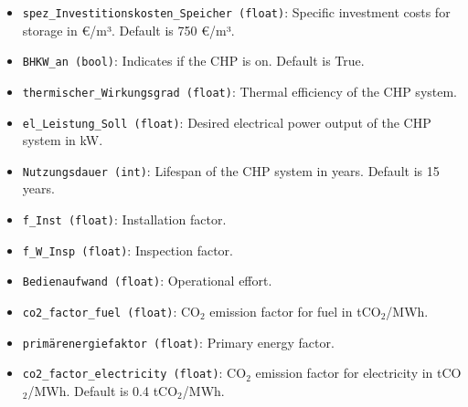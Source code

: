 \begin{itemize}
    \item \texttt{spez\_Investitionskosten\_Speicher (float)}: Specific investment costs for storage in €/m³. Default is 750 €/m³.
    \item \texttt{BHKW\_an (bool)}: Indicates if the CHP is on. Default is True.
    \item \texttt{thermischer\_Wirkungsgrad (float)}: Thermal efficiency of the CHP system.
    \item \texttt{el\_Leistung\_Soll (float)}: Desired electrical power output of the CHP system in kW.
    \item \texttt{Nutzungsdauer (int)}: Lifespan of the CHP system in years. Default is 15 years.
    \item \texttt{f\_Inst (float)}: Installation factor.
    \item \texttt{f\_W\_Insp (float)}: Inspection factor.
    \item \texttt{Bedienaufwand (float)}: Operational effort.
    \item \texttt{co2\_factor\_fuel (float)}: CO$_2$ emission factor for fuel in tCO$_2$/MWh.
    \item \texttt{primärenergiefaktor (float)}: Primary energy factor.
    \item \texttt{co2\_factor\_electricity (float)}: CO$_2$ emission factor for electricity in tCO$_2$/MWh. Default is 0.4 tCO$_2$/MWh.
\end{itemize}

